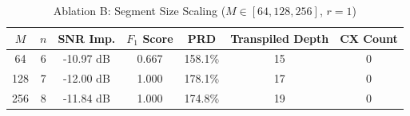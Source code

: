 \begin{table}[t]
\centering
\caption{Ablation B: Segment Size Scaling ($M \in [64, 128, 256]$, $r=1$)}
\label{tab:ablation_segment}
\begin{tabular}{ccccccc}
\hline
\textbf{$M$} & \textbf{$n$} & \textbf{SNR Imp.} & \textbf{$F_1$ Score} & \textbf{PRD} & \textbf{Transpiled Depth} & \textbf{CX Count} \\
\hline
64 & 6 & -10.97 dB & 0.667 & 158.1\% & 15 & 0 \\
128 & 7 & -12.00 dB & 1.000 & 178.1\% & 17 & 0 \\
256 & 8 & -11.84 dB & 1.000 & 174.8\% & 19 & 0 \\
\hline
\end{tabular}
\end{table}
